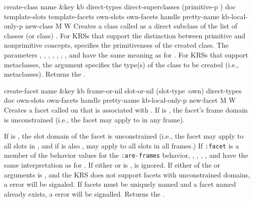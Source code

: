 \begin{okbcop}{create-class}{ name \&key kb direct-types direct-superclasses (primitive-p \true) doc template-slots template-facets own-slots own-facets handle pretty-name kb-local-only-p} { new-class } { M } { W } {  }
Creates a class called  as a direct subclass
   of the list of classes (or class) .  For KRSs
   that support the distinction between primitive and nonprimitive concepts,
    specifies the primitiveness of the created class.
   The parameters , ,
   , , , 
   , , and  have the
   same meaning as for .  For KRSs that support metaclasses,
   the  argument specifies the type(s) of the class
   to be created (i.e., metaclasses).  Returns the .
\end{okbcop}

\begin{okbcop}{create-facet}{ name \&key kb frame-or-nil slot-or-nil (slot-type :own) direct-types doc own-slots own-facets handle pretty-name kb-local-only-p} { new-facet } { M } { W } {  }
Creates a facet called  on  that is
   associated with .  If  is \false,
   the facet's frame domain is unconstrained (i.e., the facet may apply to
    in any frame).

   If  is \false, the slot domain of the facet is
   unconstrained (i.e., the facet may apply to all slots in
   , and if  is also \false, may
   apply to all slots in all frames.)
   If {\tt :facet} is a member of the behavior values for the
   {\tt :are-frames} behavior, ,
   , , ,  and
    have the same interpretation as for .
   If either  or  is \false,
    is ignored.  If either of the  or
    arguments is
   \false, and the KRS does not support facets with unconstrained domains,
   a  error will be signaled.
   If facets must be uniquely named and a facet named  already
   exists, a  error will be signalled.
   Returns the .
\end{okbcop}

